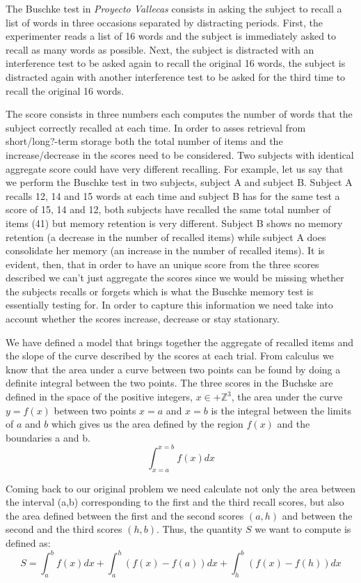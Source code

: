 \documentclass[11pt]{article}
\theoremstyle{definition}
\theoremstyle{remark}
\begin{document}
The Buschke test in \emph{Proyecto Vallecas} consists in asking the subject to recall a list of words in three occasions separated by distracting periods. First, the experimenter reads a list of 16 words and the subject is immediately asked to recall as many words as possible. Next, the subject is distracted with an interference test to be asked again to recall the original 16 words, the subject is distracted again with another interference test to be asked for the third time to recall the original 16 words.

The score consists in three numbers each computes the number of words that the subject correctly recalled at each time. In order to asses retrieval from short/long?-term storage both the total number of items and the increase/decrease in the scores need to be considered. Two subjects with identical aggregate score could have very different recalling. For example, let us say that we perform the Buschke test in two subjects, subject A and subject B. Subject A recalls 12, 14 and 15 words at each time and subject B has for the same test a score of 15, 14 and 12, both subjects have recalled the same total number of items (41) but memory retention is very different. Subject B shows no memory retention (a decrease in the number of recalled items) while subject A does consolidate her memory (an increase in the number of recalled items).
It is evident, then, that in order to have an unique score from the three scores described we can't just aggregate the scores since we would be missing whether the subjects recalls or forgets which is what the Buschke memory test is essentially testing for. In order to capture this information we need take into account whether the scores increase, decrease or stay stationary.

We have defined a model that brings together the aggregate of recalled items and the slope of the curve described by the scores at each trial. 
From calculus we know that the area under a curve between two points can be found by doing a definite integral between the two points. 
The three scores in the Buchske are defined in the space of the positive integers, $x \in +\mathbb{Z}^3$, the area under the curve $y = f(x)$ between two points $x=a$ and $x=b$ is the integral between the limits of $a$ and $b$ which gives us the area defined by the region $f(x)$ and the boundaries a and b.
\begin{equation}
\int_{x=a}^{x=b}f(x)dx
\label{eq:defint}
\end{equation}
 
Coming back to our original problem we need calculate not only the area between the interval (a,b) corresponding to the first and the third recall scores, but also the area defined between the first and the second scores $(a,h)$ and between the second and the third scores $(h,b)$.  
Thus, the quantity $S$ we want to compute is defined as:
\begin{equation}
S = \int_{a}^{b}f(x)dx + \int_{a}^{h}(f(x) - f(a))dx + \int_{h}^{b}(f(x)-f(h))dx
\label{eq:buchske}
\end{equation}
\end{document}

